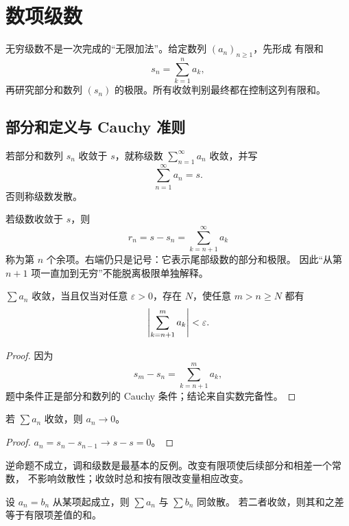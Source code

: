\chapter{数项级数}
\label{chap:numerical-series}

无穷级数不是一次完成的“无限加法”。给定数列 \((a_n)_{n\ge1}\)，先形成
有限和
\[
 s_n=\sum_{k=1}^n a_k,
\]
再研究部分和数列 \((s_n)\) 的极限。所有收敛判别最终都在控制这列有限和。

\section{部分和定义与 Cauchy 准则}

\begin{definition}
若部分和数列 \(s_n\) 收敛于 \(s\)，就称级数
\(\sum_{n=1}^\infty a_n\) 收敛，并写
\[
 \sum_{n=1}^\infty a_n=s.
\]
否则称级数发散。
\end{definition}

若级数收敛于 \(s\)，则
\[
 r_n=s-s_n=\sum_{k=n+1}^{\infty}a_k
\]
称为第 \(n\) 个余项。右端仍只是记号：它表示尾部级数的部分和极限。
因此“从第 \(n+1\) 项一直加到无穷”不能脱离极限单独解释。

\begin{theorem}
\label{thm:series-cauchy}
\(\sum a_n\) 收敛，当且仅当对任意 \(\varepsilon>0\)，存在
\(N\)，使任意 \(m>n\ge N\) 都有
\[
 \left|\sum_{k=n+1}^{m}a_k\right|<\varepsilon.
\]
\end{theorem}

\begin{proof}
因为
\[
 s_m-s_n=\sum_{k=n+1}^m a_k,
\]
题中条件正是部分和数列的 Cauchy 条件；结论来自实数完备性。
\end{proof}

\begin{corollary}[通项必要条件]
若 \(\sum a_n\) 收敛，则 \(a_n\to0\)。
\end{corollary}

\begin{proof}
\(a_n=s_n-s_{n-1}\to s-s=0\)。
\end{proof}

逆命题不成立，调和级数是最基本的反例。改变有限项使后续部分和相差一个常数，
不影响敛散性；收敛时总和按有限改变量相应改变。

\begin{proposition}[有限项的影响]
\label{prop:series-finite-modification}
设 \(a_n=b_n\) 从某项起成立，则 \(\sum a_n\) 与 \(\sum b_n\) 同敛散。
若二者收敛，则其和之差等于有限项差值的和。
\end{proposition}

